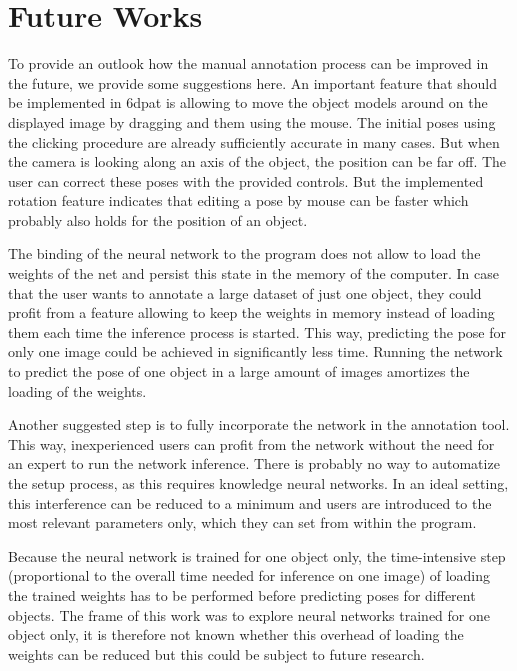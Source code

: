 \chapter{Future Works} \label{chapter:future_work}

To provide an outlook how the manual annotation process can be improved in the future, we provide some suggestions here. An important feature that should be implemented in \ac{6dpat} is allowing to move the object models around on the displayed image by dragging and them using the mouse. The initial poses using the clicking procedure are already sufficiently accurate in many cases. But when the camera is looking along an axis of the object, the position can be far off. The user can correct these poses with the provided controls. But the implemented rotation feature indicates that editing a pose by mouse can be faster which probably also holds for the position of an object.

The binding of the neural network to the program does not allow to load the weights of the net and persist this state in the memory of the computer. In case that the user wants to annotate a large dataset of just one object, they could profit from a feature allowing to keep the weights in memory instead of loading them each time the inference process is started. This way, predicting the pose for only one image could be achieved in significantly less time. Running the network to predict the pose of one object in a large amount of images amortizes the loading of the weights.

Another suggested step is to fully incorporate the network in the annotation tool. This way, inexperienced users can profit from the network without the need for an expert to run the network inference. There is probably no way to automatize the setup process, as this requires knowledge neural networks. In an ideal setting, this interference can be reduced to a minimum and users are introduced to the most relevant parameters only, which they can set from within the program.

Because the neural network is trained for one object only, the time-intensive step (proportional to the overall time needed for inference on one image) of loading the trained weights has to be performed before predicting poses for different objects. The frame of this work was to explore neural networks trained for one object only, it is therefore not known whether this overhead of loading the weights can be reduced but this could be subject to future research.






